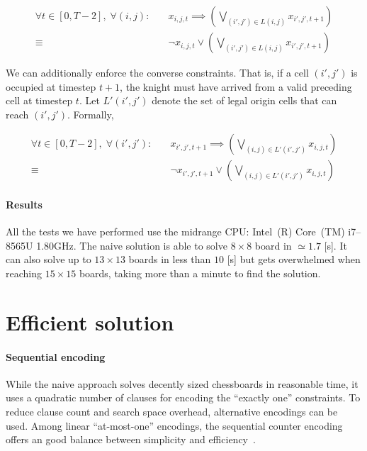 \documentclass[a4paper, 11pt]{article}
\begin{document}
\begin{equation}
    \begin{aligned}
    \forall t \in [0, T-2], \; \forall (i, j) : \quad & x_{i,j,t} \implies \left( \bigvee_{(i', j') \in L(i,j)} x_{i',j',t+1} \right) \\
    \equiv \quad & \neg x_{i,j,t} \vee \left( \bigvee_{(i', j') \in L(i,j)} x_{i',j',t+1} \right)
    \end{aligned}
\end{equation}

We can additionally enforce the converse constraints. That is, if a cell $(i', j')$ is occupied at timestep $t+1$, the knight must have arrived from a valid preceding cell at timestep $t$. Let $L'(i', j')$ denote the set of legal origin cells that can reach $(i', j')$. Formally, 

\begin{equation}
    \begin{aligned}
    \forall t \in [0, T-2], \; \forall (i', j') : \quad & x_{i',j',t+1} \implies \left( \bigvee_{(i, j) \in L'(i',j')} x_{i,j,t} \right) \\
    \equiv \quad & \neg x_{i',j',t+1} \vee \left( \bigvee_{(i, j) \in L'(i',j')} x_{i,j,t} \right)
    \end{aligned}
\end{equation}

\paragraph{Results}
All the tests we have performed use the midrange CPU: Intel~(R) Core~(TM) i7--8565U 1.80GHz. The naive solution is able to solve $8 \times 8$ board in $\simeq 1.7$ [s]. It can also solve up to $13 \times 13$ boards in less than $10$ [s] but gets overwhelmed when reaching $15 \times 15$ boards, taking more than a minute to find the solution.

\section{Efficient solution}
\paragraph{Sequential encoding}
While the naive approach solves decently sized chessboards in reasonable time, it uses a quadratic number of clauses for encoding the ``exactly one'' constraints.
To reduce clause count and search space overhead, alternative encodings can be used. Among linear ``at-most-one'' encodings, the sequential counter encoding offers an good balance between simplicity and efficiency~\cite{holldobler2013efficient}.
\end{document}
